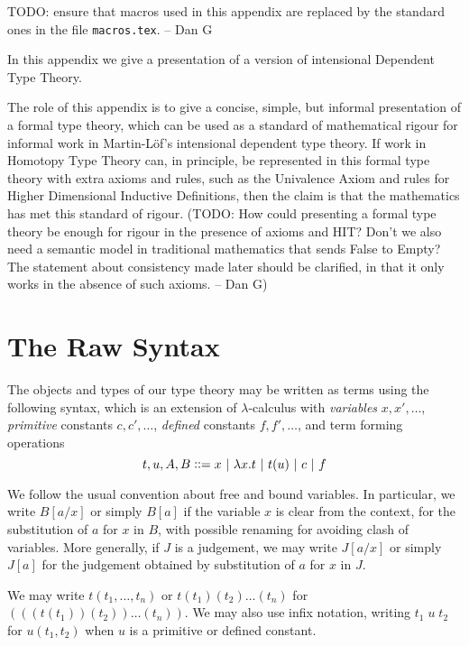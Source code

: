 {\newcommand{\Fam}{{\sf Fam}}
\newcommand{\pacomment}[1]{}
\newcommand{\myrefl}[1]{{\sf refl_{#1}}}

TODO: ensure that macros used in this appendix are replaced by the standard
ones in the file {\tt macros.tex}. -- Dan G

In this appendix we give a presentation of a version of intensional
Dependent Type Theory. 

The role of this appendix is to give a concise, simple, but informal
presentation of a formal type theory, which can be 
used as a standard of mathematical rigour for informal work in
Martin-L\"{o}f's intensional dependent type theory.  If work in
Homotopy Type Theory can, in principle, be represented in this formal
type theory with extra axioms and rules, such as the Univalence Axiom and
rules for Higher Dimensional Inductive Definitions,
then the claim is that the mathematics has met this standard of
rigour. (TODO: How could presenting a formal type theory be enough for
rigour in the presence of axioms and HIT?  Don't we also need a semantic 
model in traditional mathematics that sends False to Empty? The statement about
consistency made later should be clarified, in that it only works in the absence
of such axioms. -- Dan G)

\section*{The Raw Syntax}
 The objects and types of our type theory may be written as terms using the following syntax, which is an extension
of $\lambda$-calculus with {\em variables} $x, x',\dots$, {\em primitive} constants $c,c',\dots$, {\em defined} constants $f,f',\dots$, and term
forming operations
$$
t,u,A,B\vcentcolon\vcentcolon= x~|~\lambda x.t~|~t(u)~|~c~|~f
$$

 We follow the usual convention about free and bound variables. In particular,
we write $B[a/x]$ or simply $B[a]$ if the variable $x$ is clear from the context, for the 
substitution of $a$ for $x$ in $B$, with possible renaming for avoiding clash of variables.
More generally, if $J$ is a judgement, we may write $J[a/x]$ or simply $J[a]$ for the 
judgement obtained by substitution of $a$ for $x$ in $J$.

\medskip

 We may write $t(t_1,\dots,t_n)$ or $t(t_1)(t_2)\dots (t_n)$ for $(((t(t_1))(t_2))\dots (t_n))$.  We may also use infix notation, writing $t_1\; u\; t_2$ for $u(t_1,t_2)$ when $u$ is a primitive or defined constant.

}
